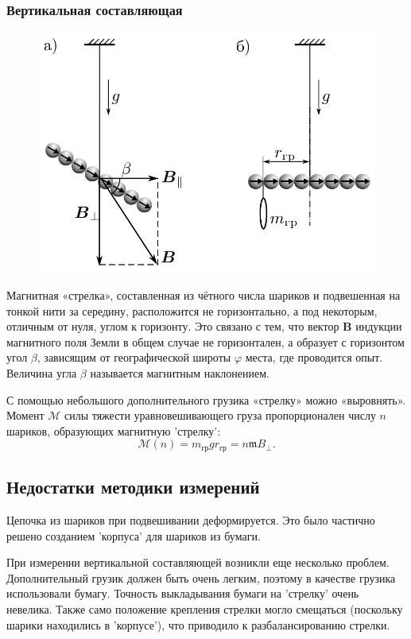 \documentclass[12pt,a4paper]{article}
\begin{document}
	\subsubsection*{Вертикальная составляющая}
	
	\begin{figure}
		\includegraphics[width=0.8\linewidth]{res/vertical.png}
		\vspace{30pt}
	\end{figure}
	
	Магнитная «стрелка», составленная из чётного числа
	шариков и подвешенная на тонкой нити за середину, расположится не горизонтально, а под некоторым, отличным от нуля, углом к горизонту. Это связано с тем, что вектор $\boldsymbol{B}$ индукции магнитного поля Земли в общем случае не горизонтален, а образует с горизонтом
	угол $\beta$, зависящим от географической широты $\varphi$
	места, где проводится опыт. Величина угла $\beta$
	называется магнитным наклонением.
	
	С помощью небольшого дополнительного грузика «стрелку» можно «выровнять». Момент $\mathcal{M}$ силы тяжести уравновешивающего груза пропорционален числу $n$ шариков, образующих магнитную 'стрелку':
	$$\mathcal{M}(n) = m_{\text{гр}} g r_{\text{гр}} = n \mathfrak{m} B_\perp. $$
	
	\subsection*{Недостатки методики измерений}
	
	Цепочка из шариков при подвешивании деформируется. Это было частично решено созданием 'корпуса' для шариков из бумаги.
	
	При измерении вертикальной составляющей возникли еще несколько проблем. Дополнительный грузик должен быть очень легким, поэтому в качестве грузика использовали бумагу. Точность выкладывания бумаги на 'стрелку' очень невелика. Также само положение крепления стрелки могло смещаться (поскольку шарики находились в 'корпусе'), что приводило к разбалансированию стрелки.
	
\end{document}
